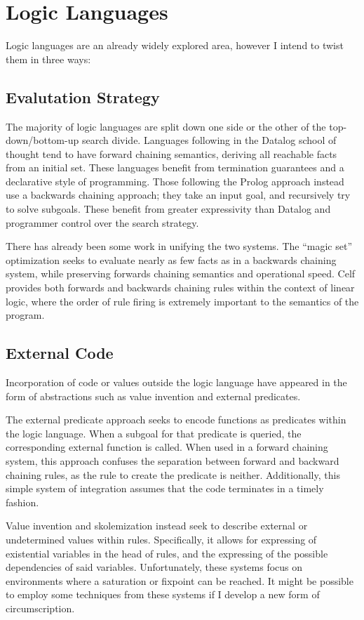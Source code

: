 \section{Logic Languages}
Logic languages are an already widely explored area, however I intend to twist them in three ways:
\subsection{Evalutation Strategy}
The majority of logic languages are split down one side or the other of the top-down/bottom-up search divide.
Languages following in the Datalog\cite{datalog} school of thought tend to have forward chaining semantics, deriving all reachable facts from an initial set.
These languages benefit from termination guarantees and a declarative style of programming.
Those following the Prolog\cite{prolog} approach instead use a backwards chaining approach;
they take an input goal, and recursively try to solve subgoals.
These benefit from greater expressivity than Datalog and programmer control over the search strategy.

There has already been some work in unifying the two systems.
The ``magic set''\cite{magicset} optimization seeks to evaluate nearly as few facts as in a backwards chaining system, while preserving forwards chaining semantics and operational speed.
Celf\cite{celf} provides both forwards and backwards chaining rules within the context of linear logic, where the order of rule firing is extremely important to the semantics of the program.
\subsection{External Code}
Incorporation of code or values outside the logic language have appeared in the form of abstractions such as value invention and external predicates.

The external predicate approach seeks to encode functions as predicates within the logic language.
When a subgoal for that predicate is queried, the corresponding external function is called\cite{gnuprolog}.
When used in a forward chaining system, this approach confuses the separation between forward and backward chaining rules, as the rule to create the predicate is neither.
Additionally, this simple system of integration assumes that the code terminates in a timely fashion.

Value invention and skolemization\cite{Calimeri2007c,Bry2010c} instead seek to describe external or undetermined values within rules.
Specifically, it allows for expressing of existential variables in the head of rules, and the expressing of the possible dependencies of said variables.
Unfortunately, these systems focus on environments where a saturation or fixpoint can be reached.
It might be possible to employ some techniques from these systems if I develop a new form of circumscription\cite{circumscription}.

